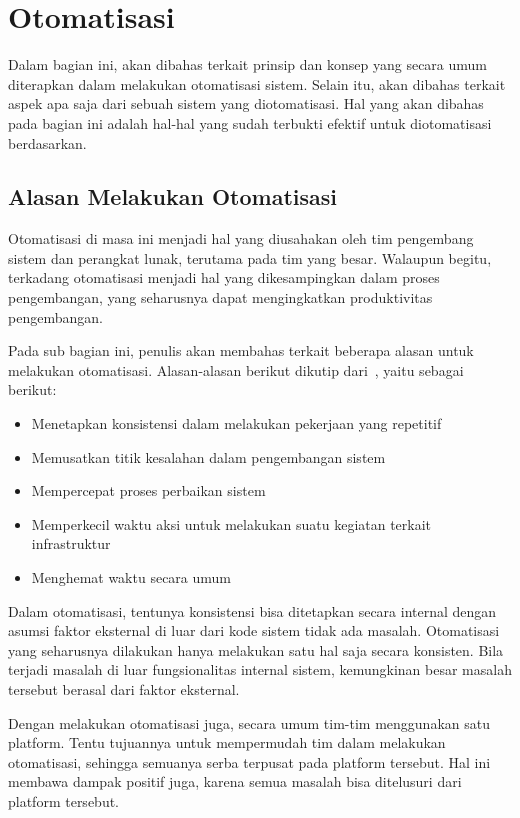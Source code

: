 \section{Otomatisasi}\label{automation}


Dalam bagian ini, akan dibahas terkait prinsip dan konsep yang secara umum diterapkan dalam melakukan otomatisasi sistem. Selain itu, akan dibahas terkait aspek apa saja dari sebuah sistem yang diotomatisasi. Hal yang akan dibahas pada bagian ini adalah hal-hal yang sudah terbukti efektif untuk diotomatisasi berdasarkan\cite{beyer2016site}.

\subsection{Alasan Melakukan Otomatisasi}
Otomatisasi di masa ini menjadi hal yang diusahakan oleh tim pengembang sistem dan perangkat lunak, terutama pada tim yang besar. Walaupun begitu, terkadang otomatisasi menjadi hal yang dikesampingkan dalam proses pengembangan, yang seharusnya dapat mengingkatkan produktivitas pengembangan.

Pada sub bagian ini, penulis akan membahas terkait beberapa alasan untuk melakukan otomatisasi. Alasan-alasan berikut dikutip dari~\cite{beyer2016site}, yaitu sebagai berikut:

\begin{itemize}
  \item Menetapkan konsistensi dalam melakukan pekerjaan yang repetitif
  \item Memusatkan titik kesalahan dalam pengembangan sistem
  \item Mempercepat proses perbaikan sistem
  \item Memperkecil waktu aksi untuk melakukan suatu kegiatan terkait infrastruktur
  \item Menghemat waktu secara umum
\end{itemize}

Dalam otomatisasi, tentunya konsistensi bisa ditetapkan secara internal dengan asumsi faktor eksternal di luar dari kode sistem tidak ada masalah. Otomatisasi yang seharusnya dilakukan hanya melakukan satu hal saja secara konsisten. Bila terjadi masalah di luar fungsionalitas internal sistem, kemungkinan besar masalah tersebut berasal dari faktor eksternal.

Dengan melakukan otomatisasi juga, secara umum tim-tim menggunakan satu platform. Tentu tujuannya untuk mempermudah tim dalam melakukan otomatisasi, sehingga semuanya serba terpusat pada platform tersebut. Hal ini membawa dampak positif juga, karena semua masalah bisa ditelusuri dari platform tersebut.


